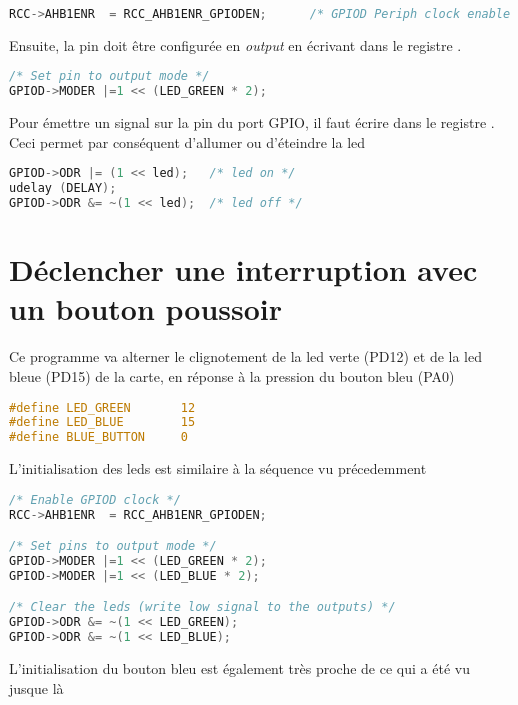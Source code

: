 \documentclass{FicheLecture}
\begin{document}
\begin{lstlisting}[language=C]
RCC->AHB1ENR  = RCC_AHB1ENR_GPIODEN;      /* GPIOD Periph clock enable */
\end{lstlisting}

Ensuite, la pin doit être configurée en \emph{output} en écrivant dans le registre . 

\begin{lstlisting}[language=C]
/* Set pin to output mode */
GPIOD->MODER |=1 << (LED_GREEN * 2);
\end{lstlisting}

Pour émettre un signal sur la pin du port GPIO, il faut écrire dans le registre .
Ceci permet par conséquent d'allumer ou d'éteindre la led

\begin{lstlisting}[language=C]
GPIOD->ODR |= (1 << led);   /* led on */
udelay (DELAY);
GPIOD->ODR &= ~(1 << led);  /* led off */
\end{lstlisting}


\section{Déclencher une interruption avec un bouton poussoir}

Ce programme va alterner le clignotement de la led verte (PD12) et de la led bleue (PD15) de la carte, en réponse à la pression du bouton bleu (PA0)

\begin{lstlisting}[language=C]
#define LED_GREEN       12
#define LED_BLUE        15
#define BLUE_BUTTON     0
\end{lstlisting}

L'initialisation des leds est similaire à la séquence vu précedemment 

\begin{lstlisting}[language=C]
/* Enable GPIOD clock */
RCC->AHB1ENR  = RCC_AHB1ENR_GPIODEN;

/* Set pins to output mode */
GPIOD->MODER |=1 << (LED_GREEN * 2);
GPIOD->MODER |=1 << (LED_BLUE * 2);

/* Clear the leds (write low signal to the outputs) */
GPIOD->ODR &= ~(1 << LED_GREEN);
GPIOD->ODR &= ~(1 << LED_BLUE);
\end{lstlisting}

L'initialisation du bouton bleu est également très proche de ce qui a été vu jusque là
\end{document}
